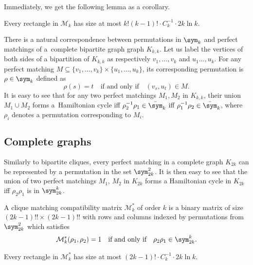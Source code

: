 Immediately, we get the following lemma as a corollary.

\begin{lemma}\label{lem:mm_size_bound}
    Every rectangle in $\mathcal{M}_k$ has size at most
    $k!(k-1)! \cdot C_k^{-1} \cdot 2k \ln k$.
\end{lemma}


There is a natural correspondence between permutations in $\sym_k$ and perfect matchings of a~complete bipartite graph graph $K_{k, k}$. Let us label the vertices of both sides of a bipartition of $K_{k, k}$ as respectively $v_1, \dots, v_k$ and $u_1 \dots, u_k$. For any perfect matching $M \subseteq \{v_1, \dots, v_k\} \times \{u_1, \dots, u_k\}$, its corresponding permutation is $\rho \in \sym_k$ defined as
$$
    \rho(s) = t \quad \text{if and only if} \quad (v_s, u_t) \in M.
$$
It is easy to see that for any two perfect matchings $M_1, M_2$ in $K_{k, k}$, their union $M_1 \cup M_2$ forms a~Hamiltonian cycle iff $\rho_2^{-1} \rho_1 \in \bar\sym_k$ iff $\rho_1^{-1} \rho_2 \in \bar\sym_k$, where $\rho_i$ denotes a permutation corresponding to $M_i$.


\subsection{Complete graphs} \label{sec:mm*}

Similarly to bipartite cliques, every perfect matching in a complete graph $K_{2k}$ can be represented by a permutation in the set $\sym_{2k}^2$. It is then easy to see that the union of two perfect matchings $M_1$, $M_2$ in $K_{2k}$ forms a Hamiltonian cycle in $K_{2k}$ iff $\rho_2 \rho_1$ is in $\sym_{2k}^k$.

\begin{definition}
    A clique matching compatibility matrix $\mathcal{M}^*_k$ of order $k$ is a binary matrix of size $(2k - 1)!! \times (2k - 1)!!$ with rows and columns indexed by permutations from $\sym_{2k}^2$ which satisfies
    $$
        \mathcal{M}^*_k(\rho_1, \rho_2) = 1 \quad \text{if and only if} \quad
        \rho_2 \rho_1 \in \sym_{2k}^k.
    $$
\end{definition}

\begin{lemma}\label{lem:mm*_size_bound}
    Every rectangle in $\mathcal{M}^*_k$ has size at most
    $(2k-1)! \cdot C_k^{-1} \cdot 2k \ln k$.
\end{lemma}

